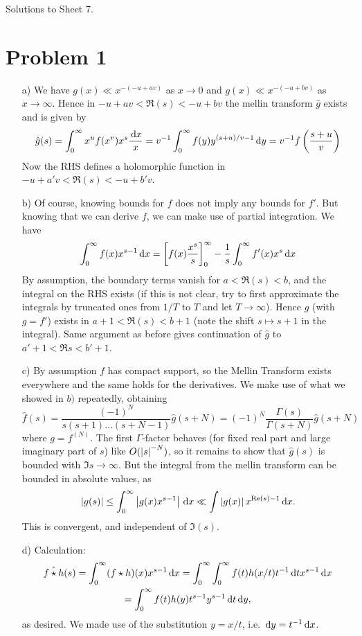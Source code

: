 \documentclass[a4paper,11pt]{article}
\author{Max von Consbruch}
\begin{document}
\begin{center}
    \huge{Solutions to Sheet 7.}
\end{center}

\section*{Problem 1}
\begin{enumerate}
\item[a)] We have $g(x) \ll x^{-(-u+av)}$ as $x \to 0$ and 
        $g(x) \ll x^{-(-u+bv)}$ as $x \to \infty$. Hence in $-u+av < 
        \Re(s)< -u+bv$ the mellin transform $\hat g$ exists and is given by
    \[
        \hat g (s) = \int_0^\infty x^uf(x^v)x^s \frac{\mathrm{\,d} x}x 
        = v^{-1} \int_0^\infty f(y)y^{(s+u)/v-1} \mathrm{\,d} y = v^{-1} f\left(
            \frac{s+u}v \right)
    \]
    Now the RHS defines a holomorphic function in $-u+a'v < \Re(s) < 
    -u + b'v$. 
\item[b)]Of course, knowing bounds for $f$ does not imply any bounds for 
    $f'$. But knowing that we can derive $f$, we can make use of partial
    integration. We have
    \[
        \int_0^\infty f(x) x^{s-1} \mathrm{\,d} x = \left[f(x)
        \frac{x^s}s\right]_0^\infty - \frac 1s \int_0^\infty f'(x)x^s \mathrm{\,d} x
    \]
    By assumption, the boundary terms vanish for $a < \Re (s) < b$, and
    the integral on the RHS exists (if this is not clear, try to first 
    approximate the integrals by truncated ones from $1/T$ to $T$ and let 
    $T \to \infty$). Hence  $\hat{g}$ (with $g=f'$) exists in $a+1 < \Re(s) <
    b+1$
    (note the shift $s \mapsto s+1$ in the integral). Same argument as
    before gives continuation of $\hat g$ to $a'+1 < \Re s < b'+1$. 
\item[c)] By assumption $f$ has compact support, so the Mellin Transform
    exists everywhere and the same holds for the derivatives. We make use
    of what we showed in $b)$ repeatedly, obtaining
    \[
        \hat f(s) = \frac{(-1)^N}{s(s+1)\dots(s+N-1)} \hat g(s+N)
        = (-1)^N \frac{\Gamma(s)}{\Gamma(s+N)} \hat g(s+N)
    \]
    where $g= f^{(N)}$. The first $\Gamma$-factor behaves (for 
    fixed real part and large imaginary part of $s$) like $O(\left\lvert s \right\rvert^{-N})$, 
    so it remains to show that $\hat g(s)$ is bounded with $\Im s \to \infty$. But the integral
    from the mellin transform can be bounded in absolute values, as
    \[
        \left\lvert g(s) \right\rvert \leq \int_0^\infty \left\lvert g(x) x^{s-1} \right\rvert \mathrm{\,d} x
        \ll \int \left\lvert g(x) \right\rvert x^{\operatorname{Re}(s)-1} \mathrm{\,d} x.
    \]
    This is convergent, and independent of $\Im(s)$. 
\item [d)] Calculation: 
    \begin{multline*}
        \hat{f \star h}(s) = \int_0^\infty (f \star h)(x) x^{s-1} \mathrm{\,d} x
        = \int_0^\infty \int_0^\infty f(t) h(x/t) t^{-1} \mathrm{\,d} t x^{s-1} \mathrm{\,d} x
        \\ = \int_0^\infty f(t) h(y) t^{s-1}y^{s-1} \mathrm{\,d} t \mathrm{\,d} y,
    \end{multline*}
    as desired. We made use of the substitution $y = x/t$, i.e. $\mathrm{\,d} y = 
    t^{-1} \mathrm{\,d} x$. 
\end{enumerate}
\end{document}

